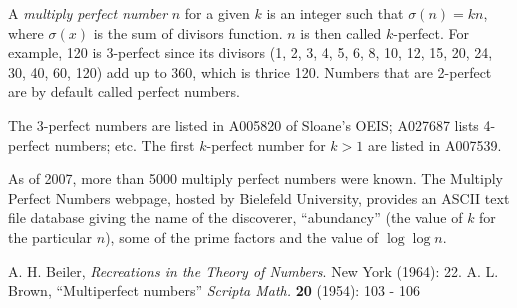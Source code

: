 \documentclass[12pt]{article}
\begin{document}
A {\em multiply perfect number} $n$ for a given $k$ is an integer such that $\sigma(n) = kn$, where $\sigma(x)$ is the sum of divisors function. $n$ is then called $k$-perfect. For example, 120 is 3-perfect since its divisors (1, 2, 3, 4, 5, 6, 8, 10, 12, 15, 20, 24, 30, 40, 60, 120) add up to 360, which is thrice 120. Numbers that are 2-perfect are by default called perfect numbers.

The 3-perfect numbers are listed in A005820 of Sloane's OEIS; A027687 lists 4-perfect numbers; etc. The first $k$-perfect number for $k > 1$ are listed in A007539.

As of 2007, more than 5000 multiply perfect numbers were known. The Multiply Perfect Numbers webpage, hosted by Bielefeld University, provides an ASCII text file database giving the name of the discoverer, ``abundancy'' (the value of $k$ for the particular $n$), some of the prime factors and the value of $\log \log n$.

\begin{thebibliography}{3}
 A. H. Beiler, {\it Recreations in the Theory of Numbers}. New York (1964): 22.
 A. L. Brown, ``Multiperfect numbers'' {\it Scripta Math.} {\bf 20} (1954): 103 - 106
\end{thebibliography}
\end{document}
